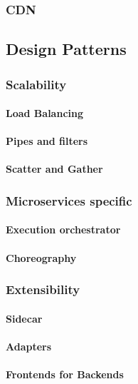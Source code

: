 \documentclass[a4paper, 11pt]{book}
\begin{document}
    \subsubsection{CDN}


    \subsection{Design Patterns}
    \lipsum[4]
    \subsubsection{Scalability}
    \paragraph{Load Balancing}
    \paragraph{Pipes and filters}
    \paragraph{Scatter and Gather}
    \subsubsection{Microservices specific}
    \paragraph{Execution orchestrator}
    \paragraph{Choreography}
    
    \subsubsection{Extensibility}

    \paragraph{Sidecar}

    \paragraph{Adapters}

    \paragraph{Frontends for Backends}
\end{document}
